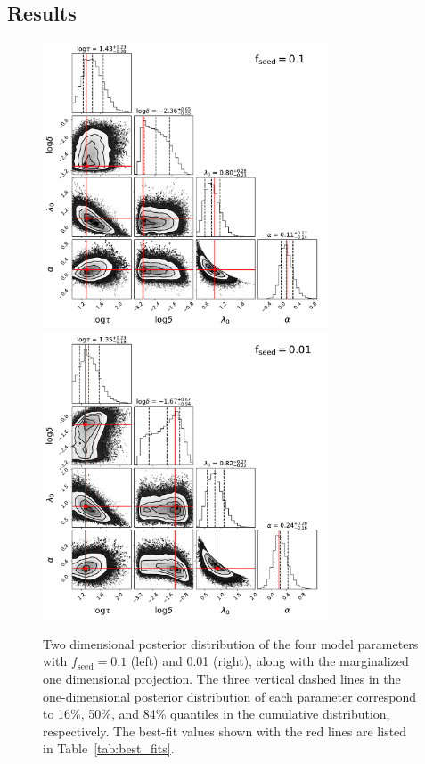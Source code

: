 \documentclass[twocolumn, twocolappendix]{aastex63}
\newcommand{\fseed}{f_\mathrm{seed}}
\begin{document}
\begin{CJK*}{UTF8}{gbsn}
\section{Results}\label{sec:fitting_result}



\begin{figure}
\centering
\includegraphics[width=85mm]{f1_corner_logtau.pdf}\hspace{3mm}
\includegraphics[width=85mm]{f2_corner_logtau.pdf}
\caption{
Two dimensional posterior distribution of the four model parameters with $\fseed=0.1$ (left) and 0.01 (right), 
along with the marginalized one dimensional projection.
The three vertical dashed lines in the one-dimensional posterior distribution of each parameter correspond to 
16\%, 50\%, and 84\% quantiles in the cumulative distribution, respectively. 
The best-fit values shown with the red lines are listed in Table~\ref{tab:best_fits}.
}
\label{fig:contour}
\vspace{5mm}
\end{figure}
%


\end{CJK*}
\end{document}
